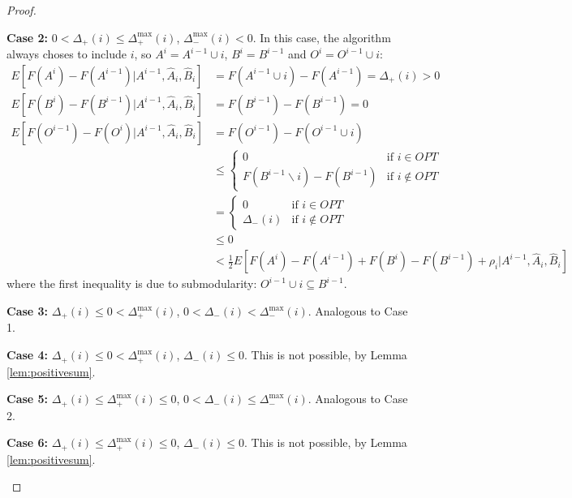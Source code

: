 \begin{proof}
\begin{description}
\item\textbf{Case 2:} $0 < \Delta_+(i) \leq \Delta_+^{\max}(i)$, $\Delta_-^{\max}(i) < 0$.
In this case, the algorithm always choses to include $i$, so $A^i = A^{i-1} \cup i$, $B^i = B^{i-1}$ and $O^i = O^{i-1} \cup i$:
\begin{align*}
E[F(A^i) - F(A^{i-1}) | A^{i-1}, \hat{A}_i, \hat{B}_i] &= F(A^{i-1} \cup i) - F(A^{i-1}) = \Delta_+(i) > 0\\
E[F(B^i) - F(B^{i-1}) | A^{i-1}, \hat{A}_i, \hat{B}_i] &= F(B^{i-1}) - F(B^{i-1}) = 0\\
E[F(O^{i-1}) - F(O^i) | A^{i-1}, \hat{A}_i, \hat{B}_i] &= F(O^{i-1}) - F(O^{i-1} \cup i) \\
&\leq \begin{cases}0 & \text{if $i\in OPT$} \\ F(B^{i-1} \backslash i) - F(B^{i-1}) & \text{if $i\not\in OPT$}\end{cases}\\
&= \begin{cases}0 & \text{if $i\in OPT$} \\ \Delta_-(i) & \text{if $i\not\in OPT$}\end{cases}\\
&\leq 0\\
&< \frac{1}{2} E[F(A^i) - F(A^{i-1}) + F(B^i) - F(B^{i-1}) + \rho_i | A^{i-1}, \hat{A}_i, \hat{B}_i]
\end{align*}
where the first inequality is due to submodularity: $O^{i-1}\cup i \subseteq B^{i-1}$.


\item\textbf{Case 3:} $\Delta_+(i) \leq 0 < \Delta_+^{\max}(i)$, $0 < \Delta_-(i) < \Delta_-^{\max}(i)$.
Analogous to Case 1.



\item\textbf{Case 4:} $\Delta_+(i) \leq 0 < \Delta_+^{\max}(i)$, $\Delta_-(i) \leq 0$.
This is not possible, by Lemma \ref{lem:positivesum}.

\item\textbf{Case 5:} $\Delta_+(i) \leq \Delta_+^{\max}(i) \leq 0$, $0 < \Delta_-(i) \leq \Delta_-^{\max}(i)$.
Analogous to Case 2.

\item\textbf{Case 6:} $\Delta_+(i) \leq \Delta_+^{\max}(i) \leq 0$, $\Delta_-(i) \leq 0$.
This is not possible, by Lemma \ref{lem:positivesum}.


\end{description}
\end{proof}







